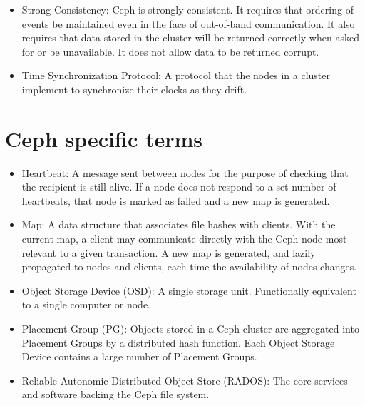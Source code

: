 \begin{itemize}
  \item Strong Consistency: Ceph is strongly consistent. It requires 
  that ordering of events be maintained even in the face of out-of-band
  communication. It also requires that data stored in the cluster will
  be returned correctly when asked for or be unavailable. It does not 
  allow data to be returned corrupt.

  \item Time Synchronization Protocol: A protocol that the nodes in
    a cluster implement to synchronize their clocks as they drift.


  
\end{itemize}

\section{Ceph specific terms}

\begin{itemize}

  \item Heartbeat: A message sent between nodes for the purpose of checking that the recipient is
  	still alive. If a node does not respond to a set number of heartbeats, that node is marked as 
  	failed and a new map is generated.

  \item Map: A data structure that associates file hashes with clients. With the current map, a 
  	client may communicate directly with the Ceph node most relevant to a given transaction. A new
  	map is generated, and lazily propagated to nodes and clients, each time the availability of 
  	nodes changes.
  	
  \item Object Storage Device (OSD): A single storage unit. Functionally equivalent to a single computer or node.

  \item Placement Group (PG): Objects stored in a Ceph cluster are aggregated into
   Placement Groups by a distributed hash function. Each Object Storage Device
   contains a large number of Placement Groups.
   
  \item Reliable Autonomic Distributed Object Store (RADOS): The core services and software backing the Ceph file system.
   

  	


\end{itemize}
